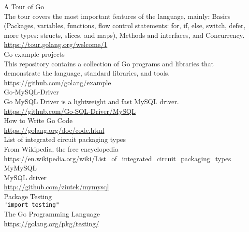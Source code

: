 \documentclass[12pt,letterpaper,dvips]{article}
\begin{document}
\noindent A Tour of Go\\
The tour covers the most important features of the language,
mainly: Basics (Packages, variables, functions, flow control
statements: for, if, else, switch, defer, more types:
structs, slices, and maps), Methods and interfaces, and
Concurrency.\\
\href{https://tour.golang.org/welcome/}{https://tour.golang.org/welcome/1}
\\

\noindent Go example projects\\
This repository contains a collection of Go programs
and libraries that demonstrate the language,
standard libraries, and tools.\\
\href{https://github.com/golang/example}{https://github.com/golang/example}
\\

\noindent Go-MySQL-Driver\\
Go MySQL Driver is a lightweight and fast MySQL driver.\\
\href{https://github.com/Go-SQL-Driver/MySQL/}{https://github.com/Go-SQL-Driver/MySQL}
\\

\noindent How to Write Go Code\\
\href{https://golang.org/doc/code.html}{https://golang.org/doc/code.html}
\\

\noindent List of integrated circuit packaging types\\
From Wikipedia, the free encyclopedia\\
\href{https://en.wikipedia.org/wiki/List\_of\_integrated\_circuit\_packaging\_types}{https://en.wikipedia.org/wiki/List\_of\_integrated\_circuit\_packaging\_types}
\\

\noindent MyMySQL\\
MySQL driver\\
\href{http://github.com/ziutek/mymysql}{http://github.com/ziutek/mymysql}
\\

\noindent Package Testing\\
\texttt{"import testing"}\\
The Go Programming Language\\
\href{https://golang.org/pkg/testing/}{https://golang.org/pkg/testing/}
\\
\end{document}
